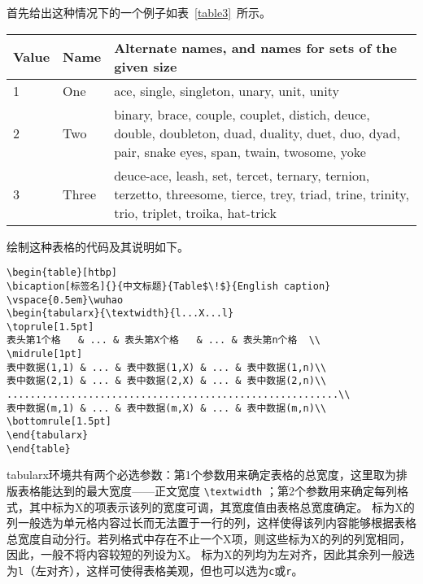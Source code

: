 首先给出这种情况下的一个例子如表~\ref{table3}~所示。
\begin{table}[htbp]
  \centering
  \vspace{0.5em}\wuhao
  \begin{tabularx}{0.7\textwidth}{llX}
    \toprule[1.5pt]
    Value & Name  & Alternate names, and names for sets of the given size                                                                                           \\\midrule[1pt]
    1     & One   & ace, single, singleton, unary, unit, unity                                                                                                      \\
    2     & Two   & binary, brace, couple, couplet, distich, deuce, double, doubleton, duad, duality, duet, duo, dyad, pair, snake eyes, span, twain, twosome, yoke \\
    3     & Three & deuce-ace, leash, set, tercet, ternary, ternion, terzetto, threesome, tierce, trey, triad, trine, trinity, trio, triplet, troika, hat-trick     \\\bottomrule[1.5pt]
  \end{tabularx}
\end{table}

绘制这种表格的代码及其说明如下。
\vspace{1em}
\begin{lstlisting}
\begin{table}[htbp]
\bicaption[标签名]{}{中文标题}{Table$\!$}{English caption}
\vspace{0.5em}\wuhao
\begin{tabularx}{\textwidth}{l...X...l}
\toprule[1.5pt]
表头第1个格   & ... & 表头第X个格   & ... & 表头第n个格  \\
\midrule[1pt]
表中数据(1,1) & ... & 表中数据(1,X) & ... & 表中数据(1,n)\\
表中数据(2,1) & ... & 表中数据(2,X) & ... & 表中数据(2,n)\\
.........................................................\\
表中数据(m,1) & ... & 表中数据(m,X) & ... & 表中数据(m,n)\\
\bottomrule[1.5pt]
\end{tabularx}
\end{table}
\end{lstlisting}


tabularx环境共有两个必选参数：第1个参数用来确定表格的总宽度，这里取为排版表格能达到的最大宽度——正文宽度 \verb|\textwidth| ；第2个参数用来确定每列格式，其中标为X的项表示该列的宽度可调，其宽度值由表格总宽度确定。
标为X的列一般选为单元格内容过长而无法置于一行的列，这样使得该列内容能够根据表格总宽度自动分行。若列格式中存在不止一个X项，则这些标为X的列的列宽相同，因此，一般不将内容较短的列设为X。
标为X的列均为左对齐，因此其余列一般选为\texttt{l}（左对齐），这样可使得表格美观，但也可以选为\texttt{c}或\texttt{r}。


